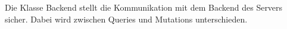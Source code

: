Die Klasse Backend stellt die Kommunikation mit dem Backend des Servers sicher.
Dabei wird zwischen Queries und Mutations unterschieden.